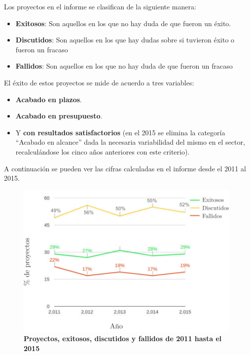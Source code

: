 Los proyectos en el informe se clasifican de la siguiente manera:
\begin{itemize}
    \item \textbf{Exitosos}: Son aquellos en los que no hay duda de que fueron un éxito.
    \item \textbf{Discutidos}: Son aquellos en los que hay dudas sobre si tuvieron éxito o fueron un fracaso
    \item \textbf{Fallidos}: Son aquellos en los que no hay duda de que fueron un fracaso
\end{itemize}

El éxito de estos proyectos se mide de acuerdo a tres variables:

\begin{itemize}
    \item \textbf{Acabado en plazos}.
    \item \textbf{Acabado en presupuesto}.
    \item Y \textbf{con resultados satisfactorios} (en el 2015 se elimina la categoría ``Acabado en alcance'' dada la necesaria variabilidad del mismo en el sector, recalculándose los cinco años anteriores con este criterio).
\end{itemize}

A continuación se pueden ver las cifras calculadas en el informe desde el 2011 al 2015.

  

\begin{figure}[h]
\includegraphics[width=11cm]{Img/Desarrollo/caos0.png}
\centering
\caption{\textbf{ \footnotesize{Proyectos, exitosos, discutidos y fallidos de 2011 hasta el 2015}}}
\label{fig:caos0}
\end{figure}


